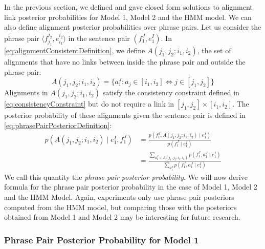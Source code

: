 In the previous section, we defined and gave closed form solutions to
alignment link posterior probabilities for Model 1, Model 2 and the HMM model.
We can also define alignment posterior probabilities over phrase pairs. Let us
consider the phrase pair $\langle f_{j_1}^{j_2}, e_{i_1}^{i_2} \rangle$ in the
sentence pair $(f_1^J, e_1^I)$. In
\autoref{eq:alignmentConsistentDefinition}, we define
$A(j_1, j_2; i_1, i_2)$, the set of alignments that have no links between
inside the phrase pair and outside the phrase pair:
%
\begin{equation}
  A(j_1, j_2;i_1, i_2) = \{a_1^J : a_j \in [i_1, i_2] \Leftrightarrow j \in [j_1,j_2] \}
  \label{eq:alignmentConsistentDefinition}
\end{equation}
%
Alignments in $A(j_1, j_2;i_1, i_2)$ satisfy the consistency constraint
defined in \autoref{eq:consistencyConstraint}
but do not require a link in $[j_1, j_2] \times [i_1, i_2]$.
The posterior probability of these alignments given the sentence
pair is defined in \autoref{eq:phrasePairPosteriorDefinition}:
%
\begin{equation}
  \begin{split}
  p(A(j_1, j_2; i_1, i_2) \mid e_1^I, f_1^J) &= \frac{p(f_1^J, A(j_1, j_2; i_1, i_2) \mid e_1^I)}{p(f_1^J \mid e_1^I)} \\
                                          &= \frac{\sum_{a_1^J \in A(j_1, j_2; i_1, i_2)} p(f_1^J,a_1^J \mid e_1^I)}{\sum_{a_1^J} p(f_1^J,a_1^J \mid e_1^I)}
  \end{split}
  \label{eq:phrasePairPosteriorDefinition}
\end{equation}
%
We call this quantity the \emph{phrase pair posterior probability}.
We will now derive formula for the phrase pair posterior probability in the
case of Model 1, Model 2 and the HMM Model. Again, experiments only use phrase pair
posteriors computed from the HMM model, but comparing those with the posteriors
obtained from Model 1 and Model 2 may be interesting for future research.

\subsubsection{Phrase Pair Posterior Probability for Model 1}

